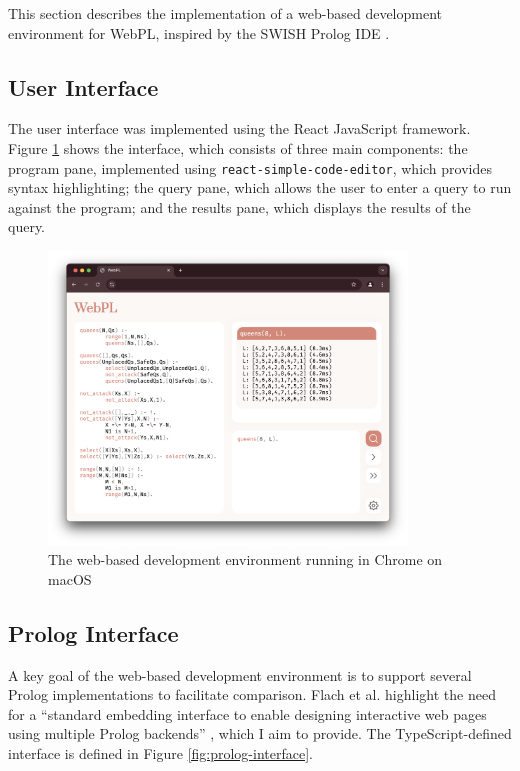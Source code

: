 \label{sec:web-dev-env}

This section describes the implementation of a web-based development environment for WebPL, inspired by the SWISH Prolog IDE \cite{wielemakerSWISHSWIPrologSharing2015}.

\subsection{User Interface}

The user interface was implemented using the React JavaScript framework. Figure \ref{fig:webpl} shows the interface, which consists of three main components: the program pane, implemented using \texttt{react-simple-code-editor}, which provides syntax highlighting; the query pane, which allows the user to enter a query to run against the program; and the results pane, which displays the results of the query.

\begin{figure}[H]
\centering
\includegraphics[width=0.85\textwidth]{07implementation_browser.png}
\caption{The web-based development environment running in Chrome on macOS}
\label{fig:webpl}
\end{figure}

\subsection{Prolog Interface}

\label{sec:prolog-interface}

A key goal of the web-based development environment is to support several Prolog implementations to facilitate comparison. Flach et al. highlight the need for a ``standard embedding interface to enable designing interactive web pages using multiple Prolog backends'' \cite{flachSimplyLogicalFirst2023}, which I aim to provide. The TypeScript-defined interface is defined in Figure \ref{fig:prolog-interface}.


